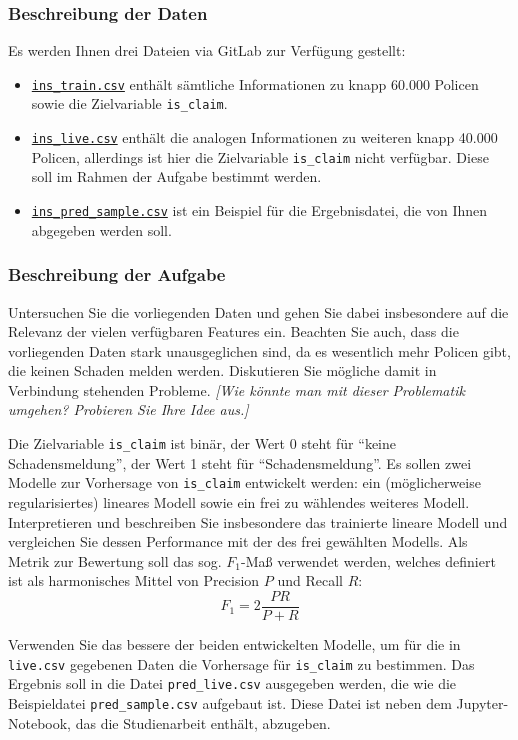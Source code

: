 \documentclass[11pt,a4paper]{article}
\begin{document}
\subsubsection*{Beschreibung der Daten}
Es werden Ihnen drei Dateien via GitLab zur Verfügung gestellt:
\begin{itemize}
	\item \href{https://gitlab.lrz.de/christian-moeller/machine-learning/-/raw/main/Studienarbeit/data/ins_train.csv}{\texttt{ins\_train.csv}} enthält sämtliche Informationen zu knapp 60.000 Policen sowie die Zielvariable \texttt{is\_claim}.
	\item \href{https://gitlab.lrz.de/christian-moeller/machine-learning/-/raw/main/Studienarbeit/data/ins_live.csv}{\texttt{ins\_live.csv}} enthält die analogen Informationen zu weiteren knapp 40.000 Policen, allerdings ist hier die Zielvariable \texttt{is\_claim} nicht verfügbar. Diese soll im Rahmen der Aufgabe bestimmt werden.
	\item \href{https://gitlab.lrz.de/christian-moeller/machine-learning/-/raw/main/Studienarbeit/data/ins_pred_sample}{\texttt{ins\_pred\_sample.csv}} ist ein Beispiel für die Ergebnisdatei, die von Ihnen abgegeben werden soll.
\end{itemize}

\subsubsection*{Beschreibung der Aufgabe}
Untersuchen Sie die vorliegenden Daten und gehen Sie dabei insbesondere auf die Relevanz der vielen verfügbaren Features ein. Beachten Sie auch, dass die vorliegenden Daten stark unausgeglichen sind, da es wesentlich mehr Policen gibt, die keinen Schaden melden werden. Diskutieren Sie mögliche damit in Verbindung stehenden Probleme. \emph{[Wie könnte man mit dieser Problematik umgehen? Probieren Sie Ihre Idee aus.]}

 Die Zielvariable \texttt{is\_claim} ist binär, der Wert 0 steht für ``keine Schadensmeldung'', der Wert 1 steht für ``Schadensmeldung''. Es sollen zwei Modelle zur Vorhersage von \texttt{is\_claim} entwickelt werden: ein (möglicherweise regularisiertes) lineares Modell sowie ein frei zu wählendes weiteres Modell. Interpretieren und beschreiben Sie insbesondere das trainierte lineare Modell und vergleichen Sie dessen Performance mit der des frei gewählten Modells. Als Metrik zur Bewertung soll das sog. $F_1$-Maß verwendet werden, welches definiert ist als harmonisches Mittel von Precision $P$ und Recall $R$:
 $$F_1 = 2\frac{PR}{P+R}$$

 Verwenden Sie das bessere der beiden entwickelten Modelle, um für die in \texttt{live.csv} gegebenen Daten die Vorhersage für \texttt{is\_claim} zu bestimmen. Das Ergebnis soll in die Datei \texttt{pred\_live.csv} ausgegeben werden, die wie die Beispieldatei \texttt{pred\_sample.csv} aufgebaut ist. Diese Datei ist neben dem Jupyter-Notebook, das die Studienarbeit enthält, abzugeben.
\end{document}
